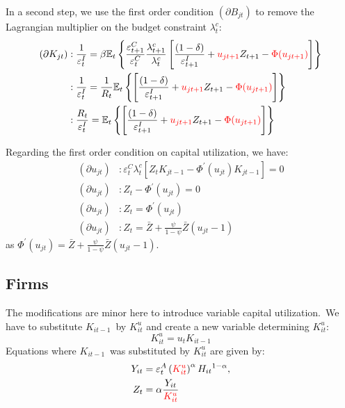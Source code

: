 \documentclass{article}%
\begin{document}
In a second step, we use the first order condition $\left(  \partial
B_{jt}\right)  $ to remove the Lagrangian multiplier on the budget constraint
$\lambda_{t}^{c}$:%
\begin{align*}
\left(  \partial K_{jt}\right)   &  :\frac{1}{\varepsilon_{t}^{I}}%
=\beta\mathbb{E}_{t}\left\{  \frac{\varepsilon_{t+1}^{C}}{\varepsilon_{t}^{C}%
}\frac{\lambda_{t+1}^{c}}{\lambda_{t}^{c}}\left[  \frac{\overset{}{\left(
1-\delta\right)  }}{\varepsilon_{t+1}^{I}}+\textcolor{red}{u_{jt+1}}Z_{t+1}%
-\textcolor{red}{\Phi(u_{jt+1})}\right]  \right\} \\
&  :\frac{1}{\varepsilon_{t}^{I}}=\frac{1}{R_{t}}\mathbb{E}_{t}\left\{
\left[  \frac{\overset{}{\left(  1-\delta\right)  }}{\varepsilon_{t+1}^{I}%
}+\textcolor{red}{u_{jt+1}}Z_{t+1}-\textcolor{red}{\Phi(u_{jt+1})}\right]
\right\} \\
&  :\frac{R_{t}}{\varepsilon_{t}^{I}}=\mathbb{E}_{t}\left\{  \left[
\frac{\overset{}{\left(  1-\delta\right)  }}{\varepsilon_{t+1}^{I}%
}+\textcolor{red}{u_{jt+1}}Z_{t+1}-\textcolor{red}{\Phi(u_{jt+1})}\right]
\right\}
\end{align*}


Regarding the first order condition on capital utilization, we have:%
\begin{align*}
\left(  \partial u_{jt}\right)   &  :\varepsilon_{t}^{C}\lambda_{t}^{c}\left[
Z_{t}K_{jt-1}-\Phi^{\prime}\left(  u_{jt}\right)  K_{jt-1}\right]  =0\\
\left(  \partial u_{jt}\right)   &  :Z_{t}-\Phi^{\prime}\left(  u_{jt}\right)
=0\\
\left(  \partial u_{jt}\right)   &  :Z_{t}=\Phi^{\prime}\left(  u_{jt}\right)
\\
\left(  \partial u_{jt}\right)   &  :Z_{t}=\bar{Z}+\frac{\psi}{1-\psi}\bar
{Z}\left(  u_{jt}-1\right)
\end{align*}
as $\Phi^{\prime}\left(  u_{jt}\right)  =\bar{Z}+\frac{\psi}{1-\psi}\bar
{Z}\left(  u_{jt}-1\right)  $.

\subsection{Firms}

The modifications are minor here to introduce variable capital
utilization.\ We have to substitute $K_{it-1}$\ by $K_{it}^{u}$ and create a
new variable determining $K_{it}^{u}$:%
\[
K_{it}^{u}=u_{t}K_{it-1}%
\]
Equations where $K_{it-1}$\ was substituted by $K_{it}^{u}$ are given by:
\begin{align}
Y_{it}  &  =\varepsilon_{t}^{A}\left(  \textcolor{red}{K_{it}^{u}}\right)
^{\alpha}H_{it}{}^{1-\alpha},\\
Z_{t}  &  =\alpha\frac{Y_{it}}{\textcolor{red}{K_{it}^{u}}}%
\end{align}
\end{document}
